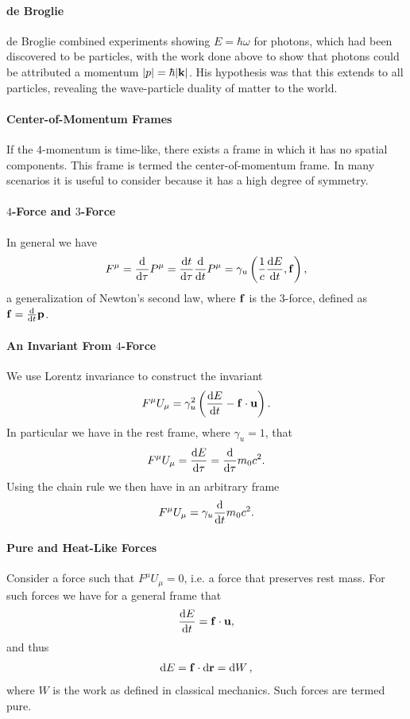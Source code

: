 \paragraph{de Broglie}
de Broglie combined experiments showing $E = \hbar\omega$ for photons, which had been discovered to be particles, with the work done above to show that photons could be attributed a momentum $\abs{p} = \hbar\abs{\vb{k}}$. His hypothesis was that this extends to all particles, revealing the wave-particle duality of matter to the world.

\paragraph{Center-of-Momentum Frames}
If the $4$-momentum is time-like, there exists a frame in which it has no spatial components. This frame is termed the center-of-momentum frame. In many scenarios it is useful to consider because it has a high degree of symmetry.

\paragraph{$4$-Force and $3$-Force}
In general we have
\begin{align*}
	F^{\mu} = \dv{\tau}P^{\mu} = \dv{t}{\tau}\dv{t}P^{\mu} = \gamma_{u}\left(\frac{1}{c}\dv{E}{t}, \vb{f}\right),
\end{align*}
a generalization of Newton's second law, where $\vb{f}$ is the $3$-force, defined as $\vb{f} = \dv{t}\vb{p}$.

\paragraph{An Invariant From $4$-Force}
We use Lorentz invariance to construct the invariant
\begin{align*}
	F^{\mu}U_{\mu} = \gamma_{u}^{2}\left(\dv{E}{t} - \vb{f}\cdot\vb{u}\right).
\end{align*}
In particular we have in the rest frame, where $\gamma_{u}  =1$, that
\begin{align*}
	F^{\mu}U_{\mu} = \dv{E}{\tau} = \dv{\tau}m_{0}c^{2}.
\end{align*}
Using the chain rule we then have in an arbitrary frame
\begin{align*}
	F^{\mu}U_{\mu} = \gamma_{u}\dv{t}m_{0}c^{2}.
\end{align*}

\paragraph{Pure and Heat-Like Forces}
Consider a force such that $F^{\mu}U_{\mu} = 0$, i.e. a force that preserves rest mass. For such forces we have for a general frame that
\begin{align*}
	\dv{E}{t} = \vb{f}\cdot\vb{u},
\end{align*}
and thus
\begin{align*}
	\dd{E} = \vb{f}\cdot\dd{\vb{r}} = \dd{W},
\end{align*}
where $W$ is the work as defined in classical mechanics. Such forces are termed pure.

